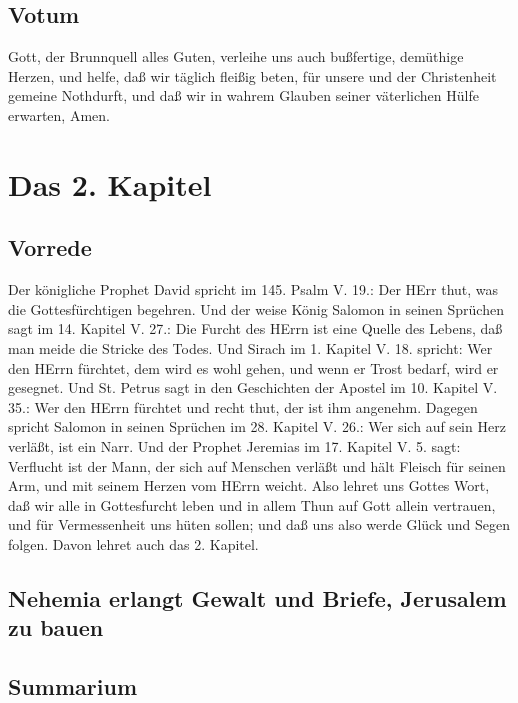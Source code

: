 \section{Votum}

Gott, der Brunnquell alles Guten, verleihe uns auch bußfertige, demüthige Herzen, und helfe, daß wir täglich fleißig beten, für unsere und der Christenheit gemeine Nothdurft, und daß wir in wahrem Glauben seiner väterlichen Hülfe erwarten, Amen.

\chapter{Das 2. Kapitel}

\section{Vorrede}

Der königliche Prophet David spricht im 145. Psalm V. 19.: Der HErr thut, was die Gottesfürchtigen begehren. Und der weise König Salomon in seinen Sprüchen sagt im 14. Kapitel V. 27.: Die Furcht des HErrn ist eine Quelle des Lebens, daß man meide die Stricke des Todes. Und Sirach im 1. Kapitel V. 18. spricht: Wer den HErrn fürchtet, dem wird es wohl gehen, und wenn er Trost bedarf, wird er gesegnet. Und St. Petrus sagt in den Geschichten der Apostel im 10. Kapitel V. 35.: Wer den HErrn fürchtet und recht thut, der ist ihm angenehm. Dagegen spricht Salomon in seinen Sprüchen im 28. Kapitel V. 26.: Wer sich auf sein Herz verläßt, ist ein Narr. Und der Prophet Jeremias im 17. Kapitel V. 5. sagt: Verflucht ist der Mann, der sich auf Menschen verläßt und hält Fleisch für seinen Arm, und mit seinem Herzen vom HErrn weicht. Also lehret uns Gottes Wort, daß wir alle in Gottesfurcht leben und in allem Thun auf Gott allein vertrauen, und für Vermessenheit uns hüten sollen; und daß uns also werde Glück und Segen folgen. Davon lehret auch das 2. Kapitel.

\section{Nehemia erlangt Gewalt und Briefe, Jerusalem zu bauen}


\section{Summarium}

